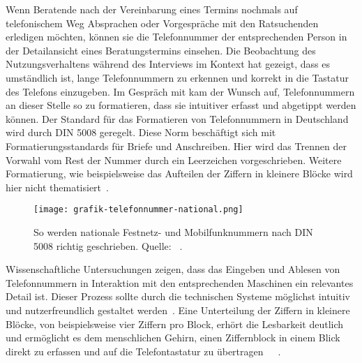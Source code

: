 Wenn Beratende nach der Vereinbarung eines Termins nochmals auf telefonischem
Weg Absprachen oder Vorgespräche mit den Ratsuchenden erledigen möchten, können
sie die Telefonnummer der entsprechenden Person in der Detailansicht eines
Beratungstermins einsehen. Die Beobachtung des Nutzungsverhaltens während des
Interviews im Kontext hat gezeigt, dass es umständlich ist, lange
Telefonnummern zu erkennen und korrekt in die Tastatur des Telefons einzugeben.
Im Gespräch mit \ipName kam der Wunsch auf, Telefonnummern an dieser Stelle so
zu formatieren, dass sie intuitiver erfasst und abgetippt werden können. Der
Standard für das Formatieren von Telefonnummern in Deutschland wird durch DIN
5008 geregelt. Diese Norm beschäftigt sich mit Formatierungsstandards für
Briefe und Anschreiben. Hier wird das Trennen der Vorwahl vom Rest der Nummer
durch ein Leerzeichen vorgeschrieben. Weitere Formatierung, wie beispielsweise
das Aufteilen der Ziffern in kleinere Blöcke wird hier nicht
thematisiert~\cite{din5008}.

\begin{figure}[H]
    \caption{So werden nationale Festnetz- und Mobilfunknummern nach DIN 5008 richtig geschrieben. Quelle: ~\cite{phoneFormatBlog}.}
    \centering
    \texttt{[image: grafik-telefonnummer-national.png]}
\end{figure}

Wissenschaftliche Untersuchungen zeigen, dass das Eingeben und Ablesen von
Telefonnummern in Interaktion mit den entsprechenden Maschinen ein relevantes
Detail ist. Dieser Prozess sollte durch die technischen Systeme möglichst
intuitiv und nutzerfreundlich gestaltet werden~\cite{humCompPhoneNumbers}. Eine
Unterteilung der Ziffern in kleinere Blöcke, von beispielsweise vier Ziffern
pro Block, erhört die Lesbarkeit deutlich und ermöglicht es dem menschlichen
Gehirn, einen Ziffernblock in einem Blick direkt zu erfassen und auf die
Telefontastatur zu
übertragen~\cite{phoneFormatBlog}~\cite{numberRecognition}~\cite{numberRepres}.